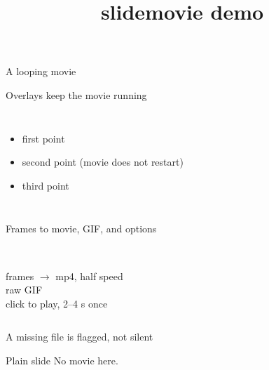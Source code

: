 \documentclass[aspectratio=169]{beamer}
\title{slidemovie demo}
\begin{document}
\begin{frame}{A looping movie}
  \centering
\end{frame}

\begin{frame}{Overlays keep the movie running}
  \begin{columns}
      \begin{itemize}
        \item<1-> first point
        \item<2-> second point (movie does not restart)
        \item<3-> third point
      \end{itemize}
  \end{columns}
\end{frame}

\begin{frame}{Frames to movie, GIF, and options}
  \begin{columns}[T]
    \centering
      \\
      \small frames $\to$ mp4, half speed
    \centering
      \\
      \small raw GIF
    \centering
      \\
      \small click to play, 2--4 s once
  \end{columns}
\end{frame}

\begin{frame}{A missing file is flagged, not silent}
  \centering

  \hyperlink{start}{}
\end{frame}

\begin{frame}[label=start]{Plain slide}
  No movie here.
\end{frame}
\end{document}
